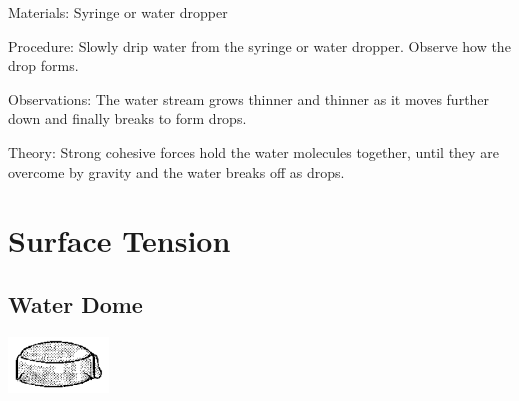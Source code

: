 \begin{multicols}{2}
\begin{description*}
\item[Materials:]{Syringe or water dropper}
\item[Procedure:]{Slowly drip water from the syringe or water dropper. Observe how the drop forms.}
\item[Observations:]{The water stream grows thinner and thinner as it moves further down and finally breaks to form drops.}
\item[Theory:]{Strong cohesive forces hold the water molecules together, until they are overcome by gravity and the water breaks off as drops.}
\end{description*}


\columnbreak


\section*{Surface Tension} 


\subsection{Water Dome}

\begin{center}
\includegraphics[width=0.2\textwidth]{./img/source/water-dome.png}
\end{center}


\end{multicols}
